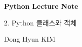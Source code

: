 \documentclass[a4paper,11pt]{article}
\begin{document}

\begin{titlepage}
    \centering
    \vspace*{\fill}

    {\Huge\bfseries Python Lecture Note\par}

    \vspace{1cm}

    {\Large 2. Python 클래스와 객체\par}

    \vspace{0.5cm}

    {\large Dong Hyun KIM\par}

    \vspace*{\fill}
\end{titlepage}



\end{document}
